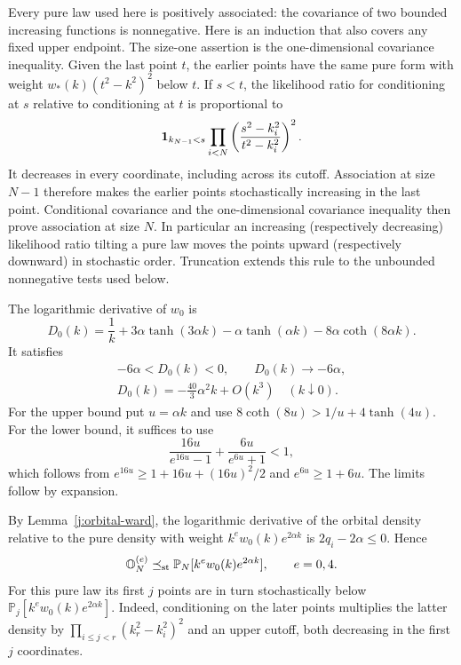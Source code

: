 Every pure law used here is positively associated: the covariance of two
bounded increasing functions is nonnegative. Here is an induction that
also covers any fixed upper endpoint. The size-one assertion is the
one-dimensional covariance inequality. Given the last point $t$, the
earlier points have the same pure form with weight
$w_*(k)(t^2-k^2)^2$ below $t$. If $s<t$, the likelihood ratio for
conditioning at $s$ relative to conditioning at $t$ is proportional to
\[
 {\bf1}_{k_{N-1}<s}\prod_{i<N}
 \left(\frac{s^2-k_i^2}{t^2-k_i^2}\right)^2.
\]
It decreases in every coordinate, including across its cutoff.
Association at size $N-1$ therefore makes the earlier points
stochastically increasing in the last point. Conditional covariance and
the one-dimensional covariance inequality then prove association at size
$N$. In particular an increasing (respectively decreasing) likelihood
ratio tilting a pure law moves the points upward (respectively downward)
in stochastic order. Truncation extends this rule to the unbounded
nonnegative tests used below.

The logarithmic derivative of $w_0$ is
\[
 D_0(k)=\frac1k+3\alpha\tanh(3\alpha k)
        -\alpha\tanh(\alpha k)-8\alpha\coth(8\alpha k).
\]
It satisfies
\begin{equation}\label{j:boundary-weight-slope}
 \begin{gathered}
 -6\alpha<D_0(k)<0,\qquad D_0(k)\longrightarrow-6\alpha,\\
 D_0(k)=-\tfrac{40}{3}\alpha^2 k+O(k^3)\quad(k\downarrow0).
 \end{gathered}
\end{equation}
For the upper bound put $u=\alpha k$ and use
$8\coth(8u)>1/u+4\tanh(4u)$. For the lower bound, it suffices to use
\[
 \frac{16u}{e^{16u}-1}+\frac{6u}{e^{6u}+1}<1,
\]
which follows from $e^{16u}\ge1+16u+(16u)^2/2$ and
$e^{6u}\ge1+6u$. The limits follow by expansion.

By Lemma~\ref{j:orbital-ward}, the logarithmic derivative of the
orbital density relative to the pure density with weight
$k^e w_0(k)e^{2\alpha k}$ is $2q_i-2\alpha\le0$. Hence
\begin{equation}\label{j:boundary-upper-pure}
 \mathbb O_N^{(e)}
 \preceq_{\rm st}\mathbb P_N[k^e w_0(k)e^{2\alpha k}],
 \qquad e=0,4.
\end{equation}
For this pure law its first $j$ points are in turn stochastically below
$\mathbb P_j[k^e w_0(k)e^{2\alpha k}]$. Indeed, conditioning on the
later points multiplies the latter density by
$\prod_{i\le j<r}(k_r^2-k_i^2)^2$ and an upper cutoff, both decreasing
in the first $j$ coordinates.

